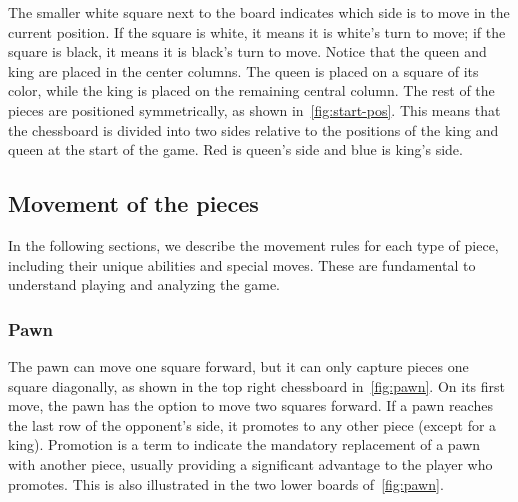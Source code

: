 \noindent The smaller white square next to the board indicates which side is to move in the current position. If the square is white, it means it is white's turn to move; if the square is black, it means it is black's turn to move. Notice that the queen and king are placed in the center columns. The queen is placed on a square of its color, while the king is placed on the remaining central column. The rest of the pieces are positioned symmetrically, as shown in~\cref{fig:start-pos}. This means that the chessboard is divided into two sides relative to the positions of the king and queen at the start of the game. Red is queen's side and blue is king's side.

\subsection*{Movement of the pieces}\label{sec:movement-pieces}

In the following sections, we describe the movement rules for each type of piece, including their unique abilities and special moves. These are fundamental to understand playing and analyzing the game.

\subsubsection*{Pawn}

The pawn can move one square forward, but it can only capture pieces one square diagonally, as shown in the top right chessboard in~\cref{fig:pawn}. On its first move, the pawn has the option to move two squares forward. If a pawn reaches the last row of the opponent's side, it promotes to any other piece (except for a king). Promotion is a term to indicate the mandatory replacement of a pawn with another piece, usually providing a significant advantage to the player who promotes. This is also illustrated in the two lower boards of~\cref{fig:pawn}.

\vspace{1em}

